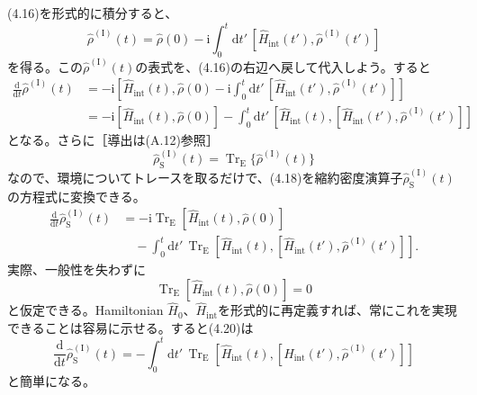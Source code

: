 \hypertarget{srcpage:159}{}\label{srcpage:159}
(4.16)を形式的に積分すると、
\begin{equation}
\hat\rho^{(\mathrm I)}(t)=\hat\rho(0)-\mathrm i\int_0^t\mathrm dt'\,[\hat H_{\mathrm{int}}(t'),\hat\rho^{(\mathrm I)}(t')]
\tag{4.17}
\end{equation}
を得る。この$\hat\rho^{(\mathrm I)}(t)$の表式を、(4.16)の右辺へ戻して代入しよう。すると
\begin{equation}
\begin{aligned}
\frac{\mathrm d}{\mathrm dt}\hat\rho^{(\mathrm I)}(t)
&=-\mathrm i\left[\hat H_{\mathrm{int}}(t),\hat\rho(0)-\mathrm i\int_0^t\mathrm dt'\,[\hat H_{\mathrm{int}}(t'),\hat\rho^{(\mathrm I)}(t')]\right]\\
&=-\mathrm i[\hat H_{\mathrm{int}}(t),\hat\rho(0)]
-\int_0^t\mathrm dt'\,[\hat H_{\mathrm{int}}(t),[\hat H_{\mathrm{int}}(t'),\hat\rho^{(\mathrm I)}(t')]]
\end{aligned}\tag{4.18}
\end{equation}
となる。さらに［導出は(A.12)参照］
\begin{equation}
\hat\rho^{(\mathrm I)}_{\mathrm S}(t)=\operatorname{Tr}_{\mathrm E}\{\hat\rho^{(\mathrm I)}(t)\}
\tag{4.19}
\end{equation}
なので、環境についてトレースを取るだけで、(4.18)を縮約密度演算子$\hat\rho^{(\mathrm I)}_{\mathrm S}(t)$の方程式に変換できる。
\begin{equation}
\begin{aligned}
\frac{\mathrm d}{\mathrm dt}\hat\rho^{(\mathrm I)}_{\mathrm S}(t)
&=-\mathrm i\operatorname{Tr}_{\mathrm E}[\hat H_{\mathrm{int}}(t),\hat\rho(0)]\\
&\quad-\int_0^t\mathrm dt'\,\operatorname{Tr}_{\mathrm E}[\hat H_{\mathrm{int}}(t),[\hat H_{\mathrm{int}}(t'),\hat\rho^{(\mathrm I)}(t')]].
\end{aligned}\tag{4.20}
\end{equation}
実際、一般性を失わずに
\begin{equation}
\operatorname{Tr}_{\mathrm E}[\hat H_{\mathrm{int}}(t),\hat\rho(0)]=0
\tag{4.21}
\end{equation}
と仮定できる。Hamiltonian $\hat H_0$、$\hat H_{\mathrm{int}}$を形式的に再定義すれば、常にこれを実現できることは容易に示せる。すると(4.20)は
\begin{equation}
\frac{\mathrm d}{\mathrm dt}\hat\rho^{(\mathrm I)}_{\mathrm S}(t)
=-\int_0^t\mathrm dt'\,\operatorname{Tr}_{\mathrm E}[\hat H_{\mathrm{int}}(t),[\hat H_{\mathrm{int}}(t'),\hat\rho^{(\mathrm I)}(t')]]
\tag{4.22}
\end{equation}
と簡単になる。

